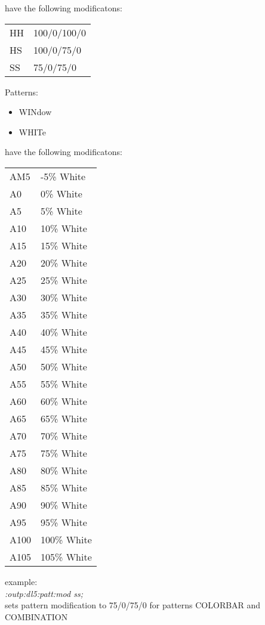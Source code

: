have the following modificatons:

\begin{tabular}{l @{ - } l}
HH  & 100/0/100/0\\
HS  & 100/0/75/0\\
SS  & 75/0/75/0 \\
\end{tabular}

Patterns:

\begin{itemize}
\item WINdow
\item WHITe
\end{itemize}

have the following modificatons:

\begin{tabular}{l l}
AM5   &    -5\% White    \\
A0    &     0\% White    \\
A5    &     5\% White    \\
A10   &    10\% White    \\
A15   &    15\% White    \\ 
A20   &    20\% White    \\
A25   &    25\% White    \\
A30   &    30\% White    \\
A35   &    35\% White    \\
A40   &    40\% White     \\
A45   &    45\% White     \\
A50   &    50\% White     \\
A55   &    55\% White     \\
A60   &    60\% White     \\
A65   &    65\% White     \\
A70   &    70\% White     \\
A75   &    75\% White     \\
A80   &    80\% White     \\
A85   &    85\% White     \\
A90   &    90\% White     \\
A95   &    95\% White     \\
A100  &   100\% White    \\
A105  &   105\% White    \\
\end{tabular}  

example:\\
\textit{:outp:dl5:patt:mod ss;}\\
sets pattern modification to 75/0/75/0 for patterns COLORBAR and COMBINATION

